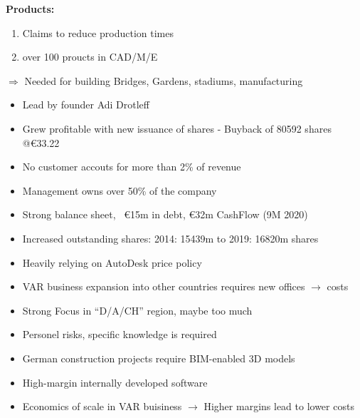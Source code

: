 \documentclass{company_analysis}
\begin{document}
\begin{minipage}{.6\linewidth}
    \faArchive\space\textbf{Products:}
    \begin{enumerate}
        \item Claims to reduce production times
        \item over 100 proucts in CAD/M/E
    \end{enumerate}
    $\Rightarrow$ Needed for building Bridges, Gardens, stadiums, manufacturing

\end{minipage}





\swot
    { %
    \begin{itemize}[leftmargin=*,noitemsep]
        \item Lead by founder Adi Drotleff
        \item Grew profitable with new issuance of shares - Buyback of \num{80592} shares @\euro\num{33,22}
        \item No customer accouts for more than 2\% of revenue
        \item Management owns  over 50\% of the company
        \item Strong balance sheet, ~\euro\num{15}m in debt, \euro\num{32}m CashFlow (9M 2020)
    \end{itemize}
    }
    { %
    \begin{itemize}[leftmargin=*, noitemsep]
        \item Increased outstanding shares: 2014: \num{15439}m to 2019: \num{16820}m shares
        \item Heavily relying on AutoDesk price policy
        \item VAR business expansion into other countries requires new offices $\rightarrow$ costs
        \item Strong Focus in \enquote{D/A/CH} region, maybe too much
        \item Personel risks, specific knowledge is required
    \end{itemize}
    }
    { %
    \begin{itemize}[leftmargin=*,noitemsep]
        \item German construction projects require BIM-enabled 3D models
        \item High-margin internally developed software
        \item Economics of scale in VAR buisiness $\rightarrow$ Higher margins lead to lower costs
    \end{itemize}
    }
\end{document}
